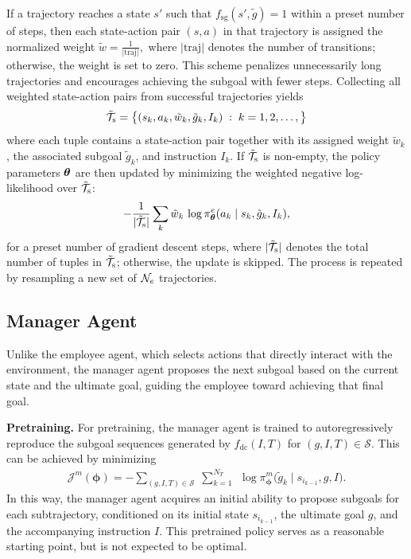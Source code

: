If a trajectory reaches a state \(s'\) such that \(f_{\mathrm{sg}}(s',\tilde g)=1\) within a preset number of steps, then each state-action pair \((s,a)\) in that trajectory is assigned the normalized weight
\(
\tilde w = \frac{1}{\lvert \text{traj} \rvert},
\)
where \(\lvert \text{traj} \rvert\) denotes the number of transitions; otherwise, the weight is set to zero. This scheme penalizes unnecessarily long trajectories and encourages achieving the subgoal with fewer steps. Collecting all weighted state-action pairs from successful trajectories yields
\[
\tilde {\mathcal{T}}_{\mathrm{s}}
= \big\{ (s_k, a_k, \tilde w_k, \tilde g_k, I_k) \;:\; k=1,2, \ldots,  \big\}
\]
where each tuple contains a state-action pair together with its assigned weight \(\tilde w_k\), the associated subgoal \(\tilde g_k\), and instruction \(I_k\). If $\tilde {\mathcal{T}}_\mathrm{s}$ is non-empty, the policy parameters $\boldsymbol \theta$ are then updated by minimizing the weighted negative log-likelihood over $\tilde  {\mathcal{T}}_{\mathrm{s}}$:
\begin{equation}
-  \frac{1}{|\tilde  {\mathcal{T}}_{\mathrm{s}}|}\sum_k
\tilde w_{k} \, \log \pi^e_{\boldsymbol \theta}(a_k \mid s_k, \tilde g_k, I_k),
\end{equation}
for a preset number of gradient descent steps, where $|\tilde  {\mathcal{T}}_{\mathrm{s}}|$ denotes the total number of tuples in $\tilde {\mathcal{T}}_{\mathrm{s}}$; otherwise, the update is skipped.  The process is repeated by resampling a new set of $\mathcal{N}_e$ trajectories. 


\subsection{Manager Agent}
Unlike the employee agent, which selects actions that directly interact with the environment, the manager agent proposes the next subgoal based on the current state and the ultimate goal, guiding the employee toward achieving that final goal.

\textbf{Pretraining.} For pretraining, the manager agent is trained to autoregressively reproduce the subgoal sequences generated by $f_{\text{dc}}(I, T)$ for $(g, I, T) \in \mathcal{S}$. This can be achieved by minimizing
\begin{align}
    \mathcal{J}^m(\boldsymbol{\phi})
    = - \sum_{(g, I, T) \in \mathcal{S}} \; \sum_{k = 1}^{N_T}
        ~~\log \pi_{\boldsymbol{\phi}}^{m} \big( \tilde{g}_k \mid s_{i_{k-1}}, g, I \big).
\end{align}
In this way, the manager agent acquires an initial ability to propose subgoals for each subtrajectory, conditioned on its initial state \(s_{i_{k-1}}\), the ultimate goal \(g\), and the accompanying instruction \(I\). This pretrained policy serves as a reasonable starting point, but is not expected to be optimal. 

